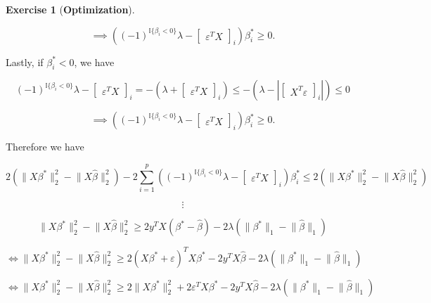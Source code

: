 \documentclass{article}
\theoremstyle{definition}
\newtheorem{exercise}{Exercise}
\theoremstyle{definition}
\theoremstyle{definition}
\theoremstyle{definition}
\renewcommand{\epsilon}{\varepsilon}
\renewcommand{\epsilon}{\varepsilon}
\begin{document}
\begin{exercise}[\textbf{Optimization}]
\begin{enumerate}[(a)]
\begin{enumerate}[(i)]
  \[
   \implies  \left((-1)^{\mathbb{I}{\{\beta_i < 0\}}} \lambda-  \begin{bmatrix} \epsilon^T X \end{bmatrix}_i \right) \beta_i^*  \geq 0.
  \]
  
  Lastly, if \(\beta_i^* < 0\), we have
  
   \[
  (-1)^{\mathbb{I}{\{\beta_i < 0\}}} \lambda-  \begin{bmatrix} \epsilon^T X \end{bmatrix}_i  =   - \left( \lambda +   \begin{bmatrix} \epsilon^T X \end{bmatrix}_i \right)  \leq - \left( \lambda -  \left| \begin{bmatrix} X^T \epsilon \end{bmatrix}_i \right|  \right) \leq 0
  \]
  
  \[
   \implies  \left((-1)^{\mathbb{I}{\{\beta_i < 0\}}} \lambda-  \begin{bmatrix} \epsilon^T X \end{bmatrix}_i \right) \beta_i^*  \geq 0.
  \]
  
  Therefore we have
  
  \[
2 \left( \lVert X \beta^* \rVert_2^2  - \lVert X \hat{\beta} \rVert_2^2\right)  - 2 \sum_{i=1}^p \left((-1)^{\mathbb{I}{\{\beta_i < 0\}}} \lambda-  \begin{bmatrix} \epsilon^T X \end{bmatrix}_i \right) \beta_i^*  \leq 2 \left( \lVert X \beta^* \rVert_2^2  - \lVert X \hat{\beta} \rVert_2^2\right) 
\]

\[
\vdots
\]

\[
\lVert X \beta^* \rVert_2^2  -  \lVert X \hat{\beta} \rVert_2^2   \geq  2 y^T X ( \beta^* - \hat{\beta} )  - 2\lambda (\lVert \beta^* \rVert_1 - \lVert \hat{\beta} \rVert_1 ) 
\]

\[
\iff \lVert X \beta^* \rVert_2^2  -  \lVert X \hat{\beta} \rVert_2^2   \geq  2 (X \beta^* + \epsilon)^T X \beta^* - 2 y^T X\hat{\beta}   - 2\lambda (\lVert \beta^* \rVert_1 - \lVert \hat{\beta} \rVert_1 ) 
\]

\[
\iff \lVert X \beta^* \rVert_2^2  -  \lVert X \hat{\beta} \rVert_2^2   \geq   2\lVert X \beta^* \rVert_2^2 + 2 \epsilon^T X \beta^* - 2 y^T X\hat{\beta}   - 2\lambda (\lVert \beta^* \rVert_1 - \lVert \hat{\beta} \rVert_1 ) 
\]

%



\end{enumerate}
\end{enumerate}
\end{exercise}
\end{document}
